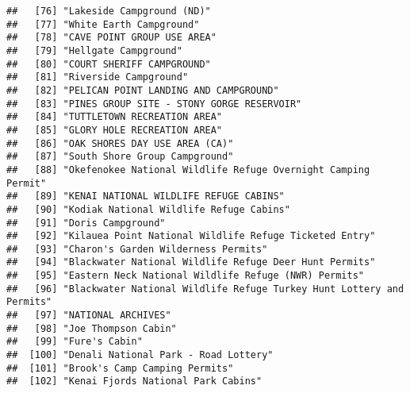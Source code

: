 \documentclass[
]{article}
\begin{document}
\begin{verbatim}
##   [76] "Lakeside Campground (ND)"                                                            
##   [77] "White Earth Campground"                                                              
##   [78] "CAVE POINT GROUP USE AREA"                                                           
##   [79] "Hellgate Campground"                                                                 
##   [80] "COURT SHERIFF CAMPGROUND"                                                            
##   [81] "Riverside Campground"                                                                
##   [82] "PELICAN POINT LANDING AND CAMPGROUND"                                                
##   [83] "PINES GROUP SITE - STONY GORGE RESERVOIR"                                            
##   [84] "TUTTLETOWN RECREATION AREA"                                                          
##   [85] "GLORY HOLE RECREATION AREA"                                                          
##   [86] "OAK SHORES DAY USE AREA (CA)"                                                        
##   [87] "South Shore Group Campground"                                                        
##   [88] "Okefenokee National Wildlife Refuge Overnight Camping Permit"                        
##   [89] "KENAI NATIONAL WILDLIFE REFUGE CABINS"                                               
##   [90] "Kodiak National Wildlife Refuge Cabins"                                              
##   [91] "Doris Campground"                                                                    
##   [92] "Kilauea Point National Wildlife Refuge Ticketed Entry"                               
##   [93] "Charon's Garden Wilderness Permits"                                                  
##   [94] "Blackwater National Wildlife Refuge Deer Hunt Permits"                               
##   [95] "Eastern Neck National Wildlife Refuge (NWR) Permits"                                 
##   [96] "Blackwater National Wildlife Refuge Turkey Hunt Lottery and Permits"                 
##   [97] "NATIONAL ARCHIVES"                                                                   
##   [98] "Joe Thompson Cabin"                                                                  
##   [99] "Fure's Cabin"                                                                        
##  [100] "Denali National Park - Road Lottery"                                                 
##  [101] "Brook's Camp Camping Permits"                                                        
##  [102] "Kenai Fjords National Park Cabins"                                                   

\end{verbatim}
\end{document}
